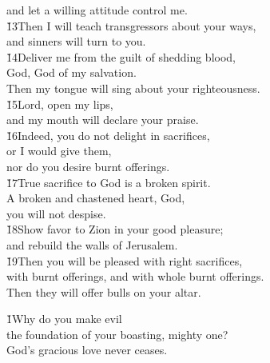 \begin{poetry}
\poemll    and let a willing attitude control me. \\
\poeml \v{13}Then I will teach transgressors about your ways, \\
\poemll    and sinners will turn to you. \\
\poeml \v{14}Deliver me from the guilt of shedding blood, \\
\poemll    God, God of my salvation. \\
\poemlll       Then my tongue will sing about your righteousness. \\
\poeml \v{15}Lord, open my lips, \\
\poemll    and my mouth will declare your praise. \\
\poeml \v{16}Indeed, you do not delight in sacrifices, \\
\poemll    or I would give them, \\
\poemlll       nor do you desire burnt offerings. \\
\poeml \v{17}True sacrifice to God is a broken spirit. \\
\poemll    A broken and chastened heart, God, \\
\poemlll       you will not despise. \\
\poeml \v{18}Show favor to Zion in your good pleasure; \\
\poemll    and rebuild the walls of Jerusalem. \\
\poeml \v{19}Then you will be pleased with right sacrifices, \\
\poemll    with burnt offerings, and with whole burnt offerings. \\
\poemlll       Then they will offer bulls on your altar.
\end{poetry}

\begin{poetry}
\poeml \v{1}Why do you make evil \\
\poemll    the foundation of your boasting, mighty one? \\
\poemlll       God's gracious love never ceases.
\end{poetry}

